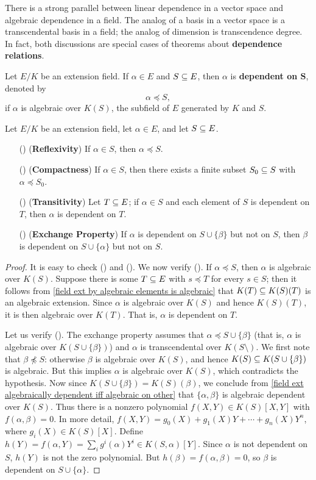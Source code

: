 There is a strong parallel between linear dependence in a vector space and algebraic dependence in a field. The analog of a basis in a vector space is a transcendental basis in a field; the analog of dimension is transcendence degree. In fact, both discussions are special cases of theorems about \textbf{dependence relations}.\par
Let $E/K$ be an extension field. If $\alpha\in E$ and $S\subseteq E$, then $\alpha$ is \textbf{dependent on $\bm{S}$}, denoted by
\[\alpha\preceq S,\]
if $\alpha$ is algebraic over $K(S)$, the subfield of $E$ generated by $K$ and $S$.
\begin{proposition}\label{field algebraic dependence prop}
Let $E/K$ be an extension field, let $\alpha\in E$, and let $S\subseteq E$.
\begin{itemize}
\item[(\rmnum{1})] (\textbf{Reflexivity}) If $\alpha\in S$, then $\alpha\preceq S$. 
\item[(\rmnum{2})] (\textbf{Compactness}) If $\alpha\in S$, then there exists a finite subset $S_0\subseteq S$ with $\alpha\preceq S_0$.
\item[(\rmnum{3})] (\textbf{Transitivity}) Let $T\subseteq E$; if $\alpha\in S$ and each element of $S$ is dependent on $T$, then $\alpha$ is dependent on $T$.
\item[(\rmnum{4})] (\textbf{Exchange Property}) If $\alpha$ is dependent on $S\cup\{\beta\}$ but not on $S$, then $\beta$ is dependent on $S\cup\{\alpha\}$ but not on $S$.
\end{itemize}
\end{proposition}
\begin{proof}
It is easy to check () and (). We now verify (). If $\alpha\preceq S$, then $\alpha$ is algebraic over $K(S)$. Suppose there is some $T\subseteq E$ with $s\preceq T$ for every $s\in S$; then it follows from \cref{field ext by algebraic elements is algebraic} that $K(T)\subseteq K(S)(T)$ is an algebraic extension. Since $\alpha$ is algebraic over $K(S)$ and hence $K(S)(T)$, it is then algebraic over $K(T)$. That is, $\alpha$ is dependent on $T$.\par
Let us verify (). The exchange property assumes that $\alpha\preceq S\cup\{\beta\}$ (that is, $\alpha$ is algebraic over $K(S\cup\{\beta\})$) and $\alpha$ is transcendental over $K(S\setminus)$. We first note that $\beta\not\preceq S$: otherwise $\beta$ is algebraic over $K(S)$, and hence $K(S)\subseteq K(S\cup\{\beta\})$ is algebraic. But this implies $\alpha$ is algebraic over $K(S)$, which contradicts the hypothesis. Now since $K(S\cup\{\beta\})=K(S)(\beta)$, we conclude from \cref{field ext algebraically dependent iff algebraic on other} that $\{\alpha,\beta\}$ is algebraic dependent over $K(S)$. Thus there is a nonzero polynomial $f(X,Y)\in K(S)[X,Y]$ with $f(\alpha,\beta)=0$. In more detail, $f(X,Y)=g_0(X)+g_1(X)Y+\cdots+g_n(X)Y^n$, where $g_i(X)\in K(S)[X]$. Define $h(Y)=f(\alpha,Y)=\sum_ig^i(\alpha)Y^i\in K(S,\alpha)[Y]$. Since $\alpha$ is not dependent on $S$, $h(Y)$ is not the zero polynomial. But $h(\beta)=f(\alpha,\beta)=0$, so $\beta$ is dependent on $S\cup\{\alpha\}$.
\end{proof}
